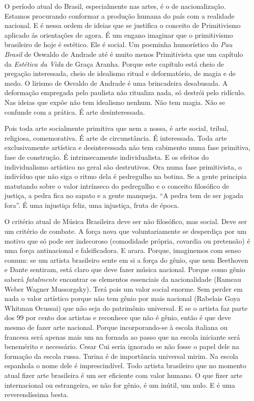 O período atual do Brasil, especialmente nas artes, é o de
nacionalização. Estamos procurando conformar a produção humana do país
com a realidade nacional. E é nessa ordem de ideias que se justifica o
conceito de Primitivismo aplicado ás orientações de agora. É um engano
imaginar que o primitivismo brasileiro de hoje é estético. Ele é social.
Um poeminha humorístico do \emph{Pau Brasil} de Oswaldo de Andrade até é
muito menos Primitivista que um capítulo da \emph{Estética da Vida} de
Graça Aranha. Porque este capítulo está cheio de pregação interessada,
cheio de idealismo ritual e deformatório, de magia e de medo. O lirismo
de Osvaldo de Andrade é uma brincadeira desabusada. A deformação
empregada pelo paulista não ritualiza nada, só destrói pelo ridículo.
Nas ideias que expõe não tem idealismo nenhum. Não tem magia. Não se
confunde com a prática. É arte desinteressada.

Pois toda arte socialmente primitiva que nem a nossa, é arte social,
tribal, religiosa, comemorativa. É arte de circunstância. É interessada.
Toda arte exclusivamente artística e desinteressada não tem cabimento
numa fase primitiva, fase de construção. É intrinsecamente
individualista. E os efeitos do individualismo artístico no geral são
destrutivos. Ora numa fase primitivista, o indivíduo que não siga o
ritmo dela é pedregulho na botina. Se a gente principia matutando sobre
o valor intrínseco do pedregulho e o conceito filosófico de justiça, a
pedra fica no sapato e a gente manqueja. ``A pedra tem de ser jogada
fora''. É uma injustiça feliz, uma injustiça, fruta de época.

O critério atual de Música Brasileira deve ser não filosófico, mas
social. Deve ser um critério de combate. A força nova que
voluntariamente se desperdiça por um motivo que só pode ser indecoroso
(comodidade própria, covardia ou pretensão) é uma força antinacional e
falsificadora. E arara. Porque, imaginemos com senso comum: se um
artista brasileiro sente em si a força do gênio, que nem Beethoven e
Dante sentiram, está claro que deve fazer música nacional. Porque como
gênio saberá \emph{fatalmente} encontrar os elementos essenciais da
nacionalidade (Rameau Weber Wagner Mussorgsky). Terá pois um valor
social enorme. Sem perder em nada o valor artístico porque não tem gênio
por mais nacional (Rabelais Goya Whitman Ocussai) que não seja do
patrimônio universal. E se o artista faz parte dos 99 por cento dos
artistas e reconhece que não é gênio, então é que deve mesmo de fazer
arte nacional. Porque incorporando-se à escola italiana ou francesa será
apenas mais um na fornada ao passo que na escola iniciante será
benemérito e necessário. Cesar Cui seria ignorado se não fosse o papel
dele na formação da escola russa. Turina é de importância universal
mirim. Na escola espanhola o nome dele é imprescindível. Todo artista
brasileiro que no momento atual fizer arte brasileira é um ser eficiente
com valor humano. O que fizer arte internacional ou estrangeira, se não
for gênio, é um inútil, um nulo. E é uma reverendíssima besta.


